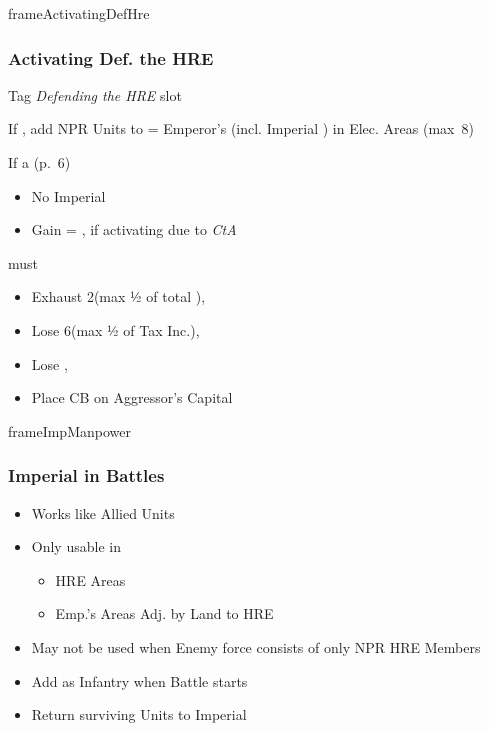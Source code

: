 \documentclass[10pt]{article}
\begin{document}
\begin{dynamiccontents*}{frameActivatingDefHre}
	\subsubsection*{Activating Def. the HRE }
	\begin{itemize}
		\item Tag \emph{Defending the HRE} slot
		\item If , add NPR Units to  \manpower = Emperor's \influence (incl. Imperial \influence) in Elec. Areas (max~8)
		{\botrules
		\item If a  (p.~6)
		\begin{itemize}
			\item No Imperial \manpower
			\item Gain \botpower = \authority, if activating due to \emph{CtA}
		\end{itemize}
		}
		\item {} must
		\begin{itemize}
			\item Exhaust 2\manpower (max ½ of total \manpower), 
			\item Lose 6\ducats (max ½ of Tax Inc.), 
			\item Lose , 
			\item Place CB on Aggressor's Capital
		\end{itemize}
		\item {}
	\end{itemize}
\end{dynamiccontents*}

\begin{dynamiccontents*}{frameImpManpower}
	\subsubsection*{Imperial \manpower in Battles \normal{(p.~44)}}
	\begin{itemize}
		\item Works like Allied Units
		\item Only usable in
		\begin{itemize}
			\item HRE Areas
			\item Emp.'s Areas Adj. by Land to HRE
		\end{itemize}
		\item May not be used when Enemy force consists of only NPR HRE Members
		\item Add as Infantry when Battle starts
		\item Return surviving Units to Imperial \manpower
	\end{itemize}
\end{dynamiccontents*}
\end{document}
